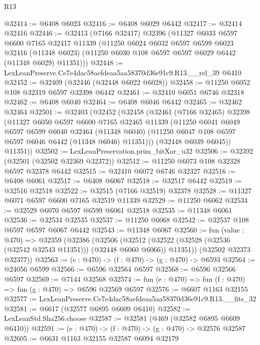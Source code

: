\begin{lexlean}{R13}
\begin{coremodule}
@32414 := @6408 @6023
@32416 := @6408 @6029 @6442
@32417 := @32414 @32416
@32446 := @32413
    (@7166 @32417)
    @32396
    (@11327
      @6033
      @6597
      @6600
      @7165
      @32417
      @11339
      (@11250
        @6024
        @6032
        @6597
        @6599
        @6023
        @32416
        (@11348 @6023)
        (@11250 @6030 @108 @6597 @6597 @6029 @6442 (@11348 @6029) @11351)))
@32448 := LexLeanPreserve.Ce7e4dac58aefdeaa5aa58370d36e91c9.R13.__rel_39 @6410
@32452 := @32409 (@32446 (@32448 @6022 @6028))
@32458 := @11250 @6052 @108 @32319 @6597 @32398 @6442
@32461 := @32410 @6051 @6746 @32318
@32462 := @6408 @6040
@32464 := @6408 @6046 @6442
@32465 := @32462 @32464
@32501 := @32403
    (@32452
      (@32458
        (@32461
          (@7166 @32465)
          @32398
          (@11327
            @6050
            @6597
            @6600
            @7165
            @32465
            @11339
            (@11250
              @6041
              @6049
              @6597
              @6599
              @6040
              @32464
              (@11348 @6040)
              (@11250 @6047 @108 @6597 @6597 @6046 @6442 (@11348 @6046) @11351)))
          (@32448 @6039 @6045))
        @11351))
@32502 := LexLeanPreservation.prim_bitXor_u32
@32506 := @32392 (@32501 (@32502 @32369 @32372))
@32512 := @11250 @6073 @108 @32328 @6597 @32378 @6442
@32515 := @32410 @6072 @6746 @32327
@32516 := @6408 @6061
@32517 := @6408 @6067
@32518 := @32517 @6442
@32519 := @32516 @32518
@32522 := @32515 (@7166 @32519) @32378
@32528 := @11327 @6071 @6597 @6600 @7165 @32519 @11339
@32529 := @11250 @6062
@32534 := @32529 @6070 @6597 @6599 @6061 @32518
@32535 := @11348 @6061
@32536 := @32534 @32535
@32537 := @11250 @6068
@32542 := @32537 @108 @6597 @6597 @6067 @6442
@32543 := @11348 @6067
@32560 := fun (value : @470) =>
  @32359
    (@32386
      (@32506
        (@32512 (@32522 (@32528 (@32536 (@32542 @32543 @11351))) (@32448 @6060 @6066)) @11351))
      (@32502 @32373 @32377))
@32563 := (e : @470) -> (f : @470) -> (g : @470) -> @6593
@32564 := @24056 @6599
@32566 := @6596 @32564 @6597
@32568 := @6596 @32566 @6597
@32569 := @7144 @32568
@32574 := fun (e : @470) => fun (f : @470) => fun (g : @470) => @6596 @32569 @6597
@32576 := @6607 @1163 @32155
@32577 := LexLeanPreserve.Ce7e4dac58aefdeaa5aa58370d36e91c9.R13.__fits_32
@32581 := @6617 (@32577 @6895 @6609 @6410)
@32582 := LexLeanStd.Sha256.choose
@32587 := @32581 (@469 (@32582 @6895 @6609 @6410))
@32591 := (e : @470) -> (f : @470) -> (g : @470) -> @32576 @32587
@32605 := @6631
    @1163
    @32155
    @32587
    @6094
    @32179

\end{coremodule}
\end{lexlean}
